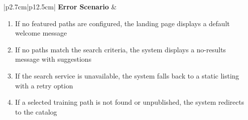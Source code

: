 \begin{table}[H]
\begin{tabular}{|p{2.7cm}|p{12.5cm}|}
        \hline
        \textbf{Error Scenario} & \begin{minipage}[t]{\linewidth}
            \begin{enumerate}[topsep=0pt,itemsep=1pt,parsep=0pt,partopsep=0pt]
                \item If no featured paths are configured, the landing page displays a default welcome message
                \item If no paths match the search criteria, the system displays a no-results message with suggestions
                \item If the search service is unavailable, the system falls back to a static listing with a retry option
                \item If a selected training path is not found or unpublished, the system redirects to the catalog
            \end{enumerate}
        \end{minipage} \\
        \hline
    \end{tabular}
    \label{tab:guest-browse-discover}
\end{table}
